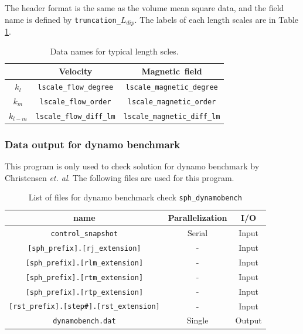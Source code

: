 The header format is the same as the volume mean square data, and the field name is defined by {\tt truncation\_}$L_{dip}$. The labels of each length scales are in Table \ref{table:scale_name}.
%
\begin{table}[htp]
\caption{Data names for typical length scles.}
\begin{center}
\begin{tabular}{|c|c|c|}
\hline
 & \mbox{Velocity} & \mbox{Magnetic field} \\ \hline
$k_{l}$ & {\tt lscale\_flow\_degree} & {\tt lscale\_magnetic\_degree} \\
$k_{m}$ & {\tt lscale\_flow\_order} & {\tt lscale\_magnetic\_order} \\
$k_{l-m}$ & {\tt lscale\_flow\_diff\_lm} & {\tt lscale\_magnetic\_diff\_lm} 
\\ \hline 
\end{tabular}
\end{center}
\label{table:scale_name}
\end{table}%
%

\subsubsection{Data output for dynamo benchmark}
\label{section:check_bench}
This program is only used to check solution for dynamo benchmark by Christensen {\it et. al}. The following files are used for this program.

\begin{table}[htp]
\caption{List of files for dynamo benchmark check {\tt sph\_dynamobench} }
\begin{center} 
\begin{tabular}{|c|c|c|}
\hline
 name & Parallelization & I/O \\ \hline \hline
\verb|control_snapshot| & Serial & Input \\ \hline
\verb|[sph_prefix].[rj_extension]|  & - & Input \\
\verb|[sph_prefix].[rlm_extension]| & - & Input \\
\verb|[sph_prefix].[rtm_extension]| & - & Input \\
\verb|[sph_prefix].[rtp_extension]| & - & Input \\ \hline
\verb|[rst_prefix].[step#].[rst_extension]| &  - & Input  \\ \hline
\verb|dynamobench.dat| & Single & Output \\ \hline
\end{tabular}
\end{center}
\label{table:sph_dynamobench}
\end{table}

